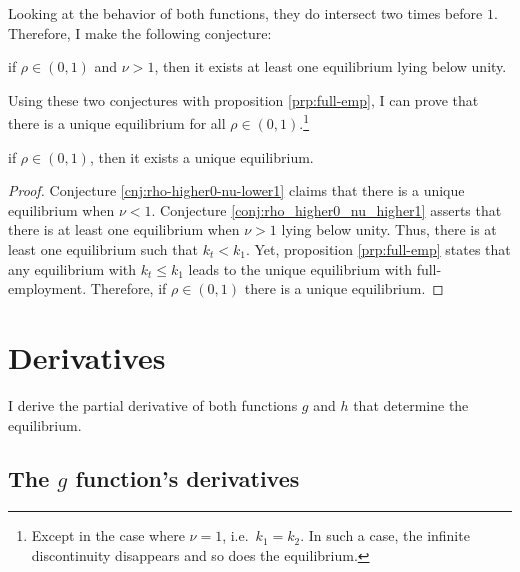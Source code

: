 \documentclass[
]{article}
\let\BeginKnitrBlock\begin \let\EndKnitrBlock\end
\begin{document}
Looking at the behavior of both functions, they do intersect two times before \(1\). Therefore, I make the following conjecture:

\BeginKnitrBlock{conjecture}
\protect\hypertarget{cnj:rho-higher0-nu-higher1}{}{\label{cnj:rho-higher0-nu-higher1} }if \(\rho \in (0,1)\) and \(\nu > 1\), then it exists at least one equilibrium lying below unity.
\EndKnitrBlock{conjecture}

Using these two conjectures with proposition \ref{prp:full-emp}, I can prove that there is a unique equilibrium for all \(\rho \in (0,1)\).\footnote{Except in the case where \(\nu = 1\), i.e.~\(k_1 = k_2\). In such a case, the infinite discontinuity disappears and so does the equilibrium.}

\BeginKnitrBlock{proposition}
\protect\hypertarget{prp:rho-higher0}{}{\label{prp:rho-higher0} }if \(\rho \in (0,1)\), then it exists a unique equilibrium.
\EndKnitrBlock{proposition}

\BeginKnitrBlock{proof}
\iffalse{} {Proof. } \fi{}Conjecture \ref{cnj:rho-higher0-nu-lower1} claims that there is a unique equilibrium when \(\nu < 1\). Conjecture \ref{conj:rho_higher0_nu_higher1} asserts that there is at least one equilibrium when \(\nu > 1\) lying below unity. Thus, there is at least one equilibrium such that \(k_t < k_1\). Yet, proposition \ref{prp:full-emp} states that any equilibrium with \(k_t \leq k_1\) leads to the unique equilibrium with full-employment. Therefore, if \(\rho \in (0,1)\) there is a unique equilibrium.
\EndKnitrBlock{proof}

\hypertarget{derivatives}{%
\section{Derivatives}\label{derivatives}}

I derive the partial derivative of both functions \(g\) and \(h\) that determine the equilibrium.

\hypertarget{the-g-functions-derivatives}{%
\subsection{\texorpdfstring{The \(g\) function's derivatives}{The g function's derivatives}}\label{the-g-functions-derivatives}}
\end{document}
